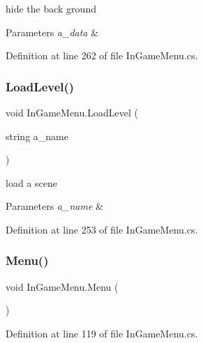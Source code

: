 hide the back ground 


\begin{DoxyParams}{Parameters}
{\em a\+\_\+data} & \\
\hline
\end{DoxyParams}


Definition at line 262 of file In\+Game\+Menu.\+cs.

\mbox{\label{class_in_game_menu_a4b43ca5c665dec97c14ff97bdb8c5958}} 
\subsubsection{\texorpdfstring{Load\+Level()}{LoadLevel()}}
{\footnotesize\ttfamily void In\+Game\+Menu.\+Load\+Level (\begin{DoxyParamCaption}\item[{string}]{a\+\_\+name }\end{DoxyParamCaption})}



load a scene 


\begin{DoxyParams}{Parameters}
{\em a\+\_\+name} & \\
\hline
\end{DoxyParams}


Definition at line 253 of file In\+Game\+Menu.\+cs.

\mbox{\label{class_in_game_menu_af1d58606ef97e81ace3ea2ca2cdf84e3}} 
\subsubsection{\texorpdfstring{Menu()}{Menu()}}
{\footnotesize\ttfamily void In\+Game\+Menu.\+Menu (\begin{DoxyParamCaption}{ }\end{DoxyParamCaption})}



Definition at line 119 of file In\+Game\+Menu.\+cs.

\mbox{\label{class_in_game_menu_a4152163786e7bac9161961f929778ca2}} 
